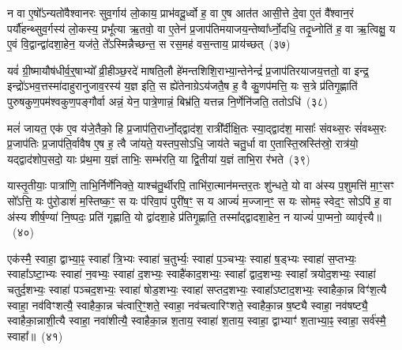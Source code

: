 {\anuvakamend[{अ॒ग्नि॒ष्टो॒मौ यथ्सु॑व॒र्गं लो॒कं प्रि॒यः प्र॒जानां॒ पञ्च॑ च}]}

न वा ए॒षो᳚\-ऽन्यतो॑वैश्वानरः सुव॒र्गाय॑ लो॒काय॒ प्राभ॑वदू॒र्ध्वो ह॒ वा ए॒ष आत॑त आसी॒त्ते दे॒वा ए॒तं वै᳚श्वान॒रं पर्यौ॑हन्थ्सुव॒र्गस्य॑ लो॒कस्य॒ प्रभू᳚त्या ऋ॒तवो॒ वा ए॒तेन॑ प्र॒जा\-प॑तिमयाजय॒न्तेष्वा᳚र्ध्नो॒दधि॒ तदृ॒ध्नोति॑ ह॒ वा ऋ॒त्विक्षु॒ य ए॒वं वि॒द्वान्द्वा॑दशा॒हेन॒ यज॑ते॒ ते᳚\-ऽस्मिन्नैच्छन्त॒ स रस॒मह॑ वस॒न्ताय॒ प्राय॑च्छत्~(३७)\ip

यवं॑ ग्री॒ष्मायौष॑धीर्व॒र्॒\mbox{}षाभ्यो᳚ व्री॒हीञ्छ॒रदे॑ माषति॒लौ हे॑मन्तशिशि॒राभ्या॒न्तेनेन्द्रं॑ प्र॒जा\-प॑तिरयाजय॒त्ततो॒ वा इन्द्र॒ इन्द्रो॑\-ऽभव॒त्तस्मा॑दाहुरानुजाव॒रस्य॑ य॒ज्ञ इति॒ स ह्ये॑तेनाग्रे\-ऽय॑जतै॒ष ह॒ वै कु॒णप॑मत्ति॒ यः स॒त्रे प्र॑तिगृ॒ह्णाति॑ पुरुषकुण॒पम॑श्वकुण॒पङ्गौर्वा अन्नं॒ येन॒ पात्रे॒णान्नं॒ बिभ्र॑ति॒ यत्तन्न नि॒र्णेनि॑जति॒ ततो\-ऽधि॑~(३८)\ip

मलं॑ जायत॒ एक॑ ए॒व य॑जे॒तैको॒ हि प्र॒जा\-प॑ति॒रार्ध्नो॒द्द्वाद॑श॒ रात्री᳚र्दीक्षि॒तः स्या॒द्द्वाद॑श॒ मासाः᳚ संवथ्स॒रः सं॑वथ्स॒रः प्र॒जा\-प॑तिः प्र॒जा\-प॑ति॒र्वावैष ए॒ष ह॒ त्वै जा॑यते॒ यस्तप॒सो\-ऽधि॒ जाय॑ते चतु॒र्धा वा ए॒तास्ति॒स्रस्ति॑स्रो॒ रात्र॑यो॒ यद्द्वाद॑शोप॒सदो॒ याः प्र॑थ॒मा य॒ज्ञं ताभिः॒ सम्भ॑रति॒ या द्वि॒तीया॑ य॒ज्ञं ताभि॒रा र॑भते~(३९)\ip

यास्तृ॒तीयाः॒ पात्रा॑णि॒ ताभि॒र्निर्णे॑निक्ते॒ याश्च॑तु॒र्थीरपि॒ ताभि॑रा॒त्मान॑मन्तर॒तः शु॑न्धते॒ यो वा अ॑स्य प॒शुमत्ति॑ मा॒ꣳ॒सꣳ सो᳚\-ऽत्ति॒ यः पु॑रो॒डाशं॑ म॒स्तिष्क॒ꣳ॒ स यः प॑रिवा॒पं पुरी॑ष॒ꣳ॒ स य आज्यं॑ म॒ज्जान॒ꣳ॒ स यः सोमꣴ॒ स्वेद॒ꣳ॒ सो\-ऽपि॑ ह॒ वा अ॑स्य शीर्\mbox{}ष॒ण्या॑ नि॒ष्पदः॒ प्रति॑ गृह्णाति॒ यो द्वा॑दशा॒हे प्र॑तिगृ॒ह्णाति॒ तस्मा᳚द्\-द्वादशा॒हेन॒ न याज्यं॑ पा॒प्मनो॒ व्यावृ॑त्त्यै॥~(४०)\ip

{\anuvakamend[{अय॑च्छ॒दधि॑ रभते द्वादशा॒हेन॑ च॒त्वारि॑ च}]}%

एक॑स्मै॒ स्वाहा॒ द्वाभ्या॒ꣴ॒ स्वाहा᳚ त्रि॒भ्यः स्वाहा॑ च॒तुर्भ्यः॒ स्वाहा॑ प॒ञ्चभ्यः॒ स्वाहा॑ ष॒ड्भ्यः स्वाहा॑ स॒प्तभ्यः॒ स्वाहा᳚\-ऽष्टा॒भ्यः स्वाहा॑ न॒वभ्यः॒ स्वाहा॑ द॒शभ्यः॒ स्वाहै॑काद॒शभ्यः॒ स्वाहा᳚ द्वाद॒शभ्यः॒ स्वाहा᳚ त्रयोद॒शभ्यः॒ स्वाहा॑ चतुर्द॒शभ्यः॒ स्वाहा॑ पञ्चद॒शभ्यः॒ स्वाहा॑ षोड॒शभ्यः॒ स्वाहा॑ सप्तद॒शभ्यः॒ स्वाहा᳚\-ऽष्टाद॒शभ्यः॒ स्वाहैका॒न्न विꣳ॑श॒त्यै स्वाहा॒ नव॑विꣳशत्यै॒ स्वाहैका॒न्न च॑त्वारि॒ꣳ॒शते॒ स्वाहा॒ नव॑चत्वारिꣳशते॒ स्वाहैका॒न्न ष॒ष्ट्यै स्वाहा॒ नव॑षष्ट्यै॒ स्वाहैका॒न्नाशी॒त्यै स्वाहा॒ नवा॑शीत्यै॒ स्वाहैका॒न्न श॒ताय॒ स्वाहा॑ श॒ताय॒ स्वाहा॒ द्वाभ्याꣳ॑ श॒ताभ्या॒ꣴ॒ स्वाहा॒ सर्व॑स्मै॒ स्वाहा᳚॥~(४१)\ip

{}%

